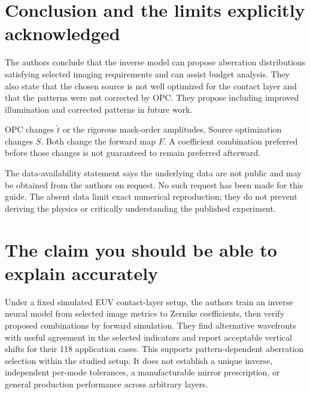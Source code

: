 \section{Conclusion and the limits explicitly acknowledged}
The authors conclude that the inverse model can propose aberration
distributions satisfying selected imaging requirements and can assist
budget analysis. They also state that the chosen source is not well
optimized for the contact layer and that the patterns were not corrected
by OPC. They propose including improved illumination and corrected
patterns in future work.

OPC changes $\widetilde t$ or the rigorous mask-order amplitudes.
Source optimization changes $S$. Both change the forward map $F$.
A coefficient combination preferred before those changes is not
guaranteed to remain preferred afterward.

The data-availability statement says the underlying data are not public
and may be obtained from the authors on request.
No such request has been made for this guide. The absent data limit
exact numerical reproduction; they do not prevent deriving the physics
or critically understanding the published experiment.

\section{The claim you should be able to explain accurately}
Under a fixed simulated EUV contact-layer setup, the authors train an
inverse neural model from selected image metrics to Zernike coefficients,
then verify proposed combinations by forward simulation. They find
alternative wavefronts with useful agreement in the selected indicators
and report acceptable vertical shifts for their 118 application cases.
This supports pattern-dependent aberration selection within the studied
setup. It does not establish a unique inverse, independent per-mode
tolerances, a manufacturable mirror prescription, or general production
performance across arbitrary layers.
